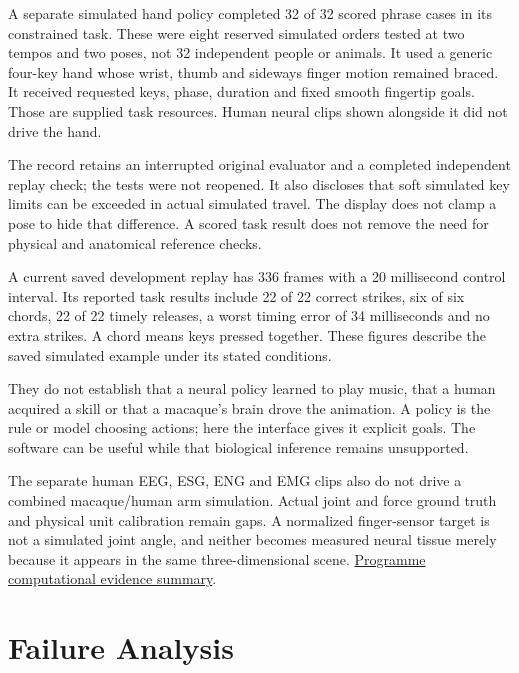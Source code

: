 A separate simulated hand policy completed 32 of 32 scored phrase cases in its constrained task. These were eight reserved simulated orders tested at two tempos and two poses, not 32 independent people or animals. It used a generic four-key hand whose wrist, thumb and sideways finger motion remained braced. It received requested keys, phase, duration and fixed smooth fingertip goals. Those are supplied task resources. Human neural clips shown alongside it did not drive the hand.\par

The record retains an interrupted original evaluator and a completed independent replay check; the tests were not reopened. It also discloses that soft simulated key limits can be exceeded in actual simulated travel. The display does not clamp a pose to hide that difference. A scored task result does not remove the need for physical and anatomical reference checks.\par

A current saved development replay has 336 frames with a 20 millisecond control interval. Its reported task results include 22 of 22 correct strikes, six of six chords, 22 of 22 timely releases, a worst timing error of 34 milliseconds and no extra strikes. A chord means keys pressed together. These figures describe the saved simulated example under its stated conditions.\par

They do not establish that a neural policy learned to play music, that a human acquired a skill or that a macaque's brain drove the animation. A policy is the rule or model choosing actions; here the interface gives it explicit goals. The software can be useful while that biological inference remains unsupported.\par

The separate human EEG, ESG, ENG and EMG clips also do not drive a combined macaque/human arm simulation. Actual joint and force ground truth and physical unit calibration remain gaps. A normalized finger-sensor target is not a simulated joint angle, and neither becomes measured neural tissue merely because it appears in the same three-dimensional scene. \href{research-evidence.json}{Programme computational evidence summary}.\par

\section{Failure Analysis}

